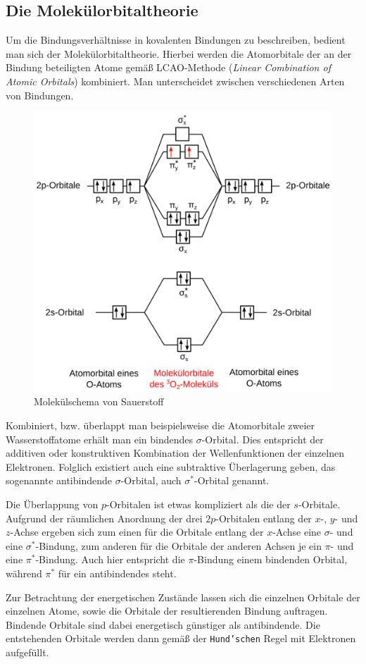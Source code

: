 \documentclass{scrartcl}
\begin{document}
\subsection{Die Molekülorbitaltheorie}
Um die Bindungsverhältnisse in kovalenten Bindungen zu beschreiben, bedient man sich der Molekülorbitaltheorie. Hierbei werden die Atomorbitale der an der Bindung beteiligten Atome gemäß LCAO-Methode (\textit{Linear Combination of Atomic Orbitals}) kombiniert. Man unterscheidet zwischen verschiedenen Arten von Bindungen.
\begin{figure}
	\centering
\caption{Molekülschema von Sauerstoff\protect\footnotemark}
	\includegraphics[width=.5\textwidth]{MO_O2.pdf}
\end{figure}
Kombiniert, bzw. überlappt man beispielsweise die Atomorbitale zweier Wasserstoffatome erhält man ein bindendes $\sigma$-Orbital. Dies entspricht der additiven oder konstruktiven Kombination der Wellenfunktionen der einzelnen Elektronen. Folglich existiert auch eine subtraktive Überlagerung geben, das sogenannte antibindende $\sigma$-Orbital, auch $\sigma^{*}$-Orbital genannt. 

Die Überlappung von $p$-Orbitalen ist etwas kompliziert als die der $s$-Orbitale. Aufgrund der räumlichen Anordnung der drei $2p$-Orbitalen entlang der $x$-, $y$- und $z$-Achse ergeben sich zum einen für die Orbitale entlang der $x$-Achse eine $\sigma$- und eine $\sigma^{*}$-Bindung, zum anderen für die Orbitale der anderen Achsen je ein $\pi$- und eine $\pi^{*}$-Bindung. Auch hier entspricht die $\pi$-Bindung einem bindenden Orbital, während $\pi^{*}$ für ein antibindendes steht. 

Zur Betrachtung der energetischen Zustände lassen sich die einzelnen Orbitale der einzelnen Atome, sowie die Orbitale der resultierenden Bindung auftragen. Bindende Orbitale sind dabei energetisch günstiger als antibindende. Die entstehenden Orbitale werden dann gemäß der \texttt{Hund'schen} Regel mit Elektronen aufgefüllt. 
\end{document}
